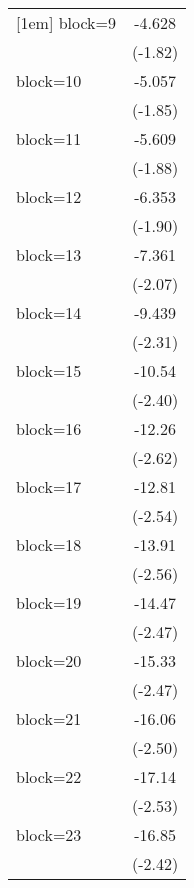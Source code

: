 {\begin{longtable}{l*{1}{c}}
[1em]
block=9             &      -4.628         \\
                    &     (-1.82)         \\
[1em]
block=10            &      -5.057         \\
                    &     (-1.85)         \\
[1em]
block=11            &      -5.609         \\
                    &     (-1.88)         \\
[1em]
block=12            &      -6.353         \\
                    &     (-1.90)         \\
[1em]
block=13            &      -7.361\sym{*}  \\
                    &     (-2.07)         \\
[1em]
block=14            &      -9.439\sym{*}  \\
                    &     (-2.31)         \\
[1em]
block=15            &      -10.54\sym{*}  \\
                    &     (-2.40)         \\
[1em]
block=16            &      -12.26\sym{*}  \\
                    &     (-2.62)         \\
[1em]
block=17            &      -12.81\sym{*}  \\
                    &     (-2.54)         \\
[1em]
block=18            &      -13.91\sym{*}  \\
                    &     (-2.56)         \\
[1em]
block=19            &      -14.47\sym{*}  \\
                    &     (-2.47)         \\
[1em]
block=20            &      -15.33\sym{*}  \\
                    &     (-2.47)         \\
[1em]
block=21            &      -16.06\sym{*}  \\
                    &     (-2.50)         \\
[1em]
block=22            &      -17.14\sym{*}  \\
                    &     (-2.53)         \\
[1em]
block=23            &      -16.85\sym{*}  \\
                    &     (-2.42)         \\

\end{longtable}}
